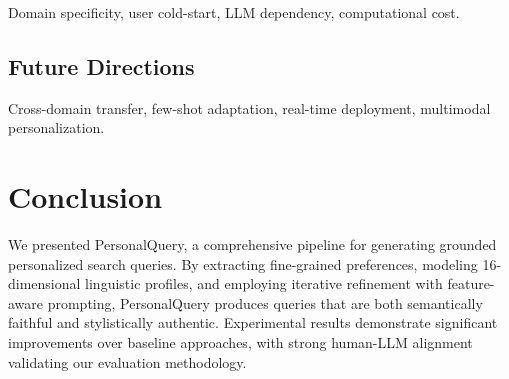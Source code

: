 \documentclass[11pt]{article}
\newcommand{\method}{PersonalQuery}
\begin{document}
Domain specificity, user cold-start, LLM dependency, computational cost.

\subsection{Future Directions}

Cross-domain transfer, few-shot adaptation, real-time deployment, multimodal personalization.

\section{Conclusion}

We presented \method{}, a comprehensive pipeline for generating grounded personalized search queries. By extracting fine-grained preferences, modeling 16-dimensional linguistic profiles, and employing iterative refinement with feature-aware prompting, \method{} produces queries that are both semantically faithful and stylistically authentic. Experimental results demonstrate significant improvements over baseline approaches, with strong human-LLM alignment validating our evaluation methodology.
\end{document}
